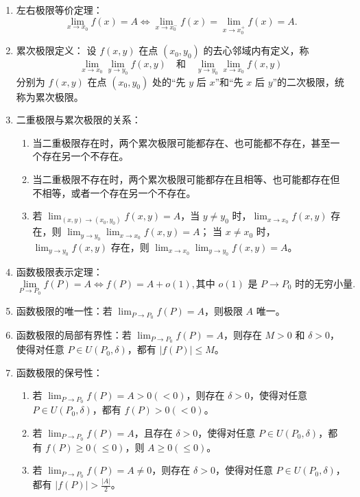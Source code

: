\documentclass[UTF8]{ctexart}
\theoremstyle{remark}
\begin{document}
\begin{enumerate}
			\item 左右极限等价定理：
			$$
			\lim_{x \to x_0} f(x) = A \iff \lim_{x \to x_0^-} f(x) = \lim_{x \to x_0^+} f(x) = A.
			$$
			
			\item 累次极限定义：
			设 $ f(x, y) $ 在点 $ (x_0, y_0) $ 的去心邻域内有定义，称
			$$
			\lim_{x \to x_0} \lim_{y \to y_0} f(x, y) \quad \text{和} \quad \lim_{y \to y_0} \lim_{x \to x_0} f(x, y)
			$$
			分别为 $ f(x, y) $ 在点 $ (x_0, y_0) $ 处的“先 $ y $ 后 $ x $”和“先 $ x $ 后 $ y $”的二次极限，统称为累次极限。
			
			\item 二重极限与累次极限的关系：
			\begin{enumerate}
				\item 当二重极限存在时，两个累次极限可能都存在、也可能都不存在，甚至一个存在另一个不存在。
				\item 当二重极限不存在时，两个累次极限可能都存在且相等、也可能都存在但不相等，或者一个存在另一个不存在。
				\item 若 $\lim_{(x, y) \to (x_0, y_0)} f(x, y) = A$，当 $ y \ne y_0 $ 时，$\lim_{x \to x_0} f(x, y)$ 存在，则 $\lim_{y \to y_0} \lim_{x \to x_0} f(x, y) = A$；
				当 $ x \ne x_0 $ 时，$\lim_{y \to y_0} f(x, y)$ 存在，则 $\lim_{x \to x_0} \lim_{y \to y_0} f(x, y) = A$。
			\end{enumerate}
			
			\item 函数极限表示定理：
			$$
			\lim_{P \to P_0} f(P) = A \iff f(P) = A + o(1), \text{其中 } o(1) \text{ 是 } P \to P_0 \text{ 时的无穷小量}.
			$$
			
			\item 函数极限的唯一性：若 $\lim_{P \to P_0} f(P) = A$，则极限 $ A $ 唯一。
			
			\item 函数极限的局部有界性：若 $\lim_{P \to P_0} f(P) = A$，则存在 $ M > 0 $ 和 $ \delta > 0 $，使得对任意 $ P \in U(P_0, \delta) $，都有 $ |f(P)| \leq M $。
			
			\item 函数极限的保号性：
			\begin{enumerate}
				\item 若 $\lim_{P \to P_0} f(P) = A > 0 (< 0)$，则存在 $ \delta > 0 $，使得对任意 $ P \in U(P_0, \delta) $，都有 $ f(P) > 0 (< 0) $。
				\item 若 $\lim_{P \to P_0} f(P) = A$，且存在 $ \delta > 0 $，使得对任意 $ P \in U(P_0, \delta) $，都有 $ f(P) \geq 0 (\leq 0) $，则 $ A \geq 0 (\leq 0) $。
				\item 若 $\lim_{P \to P_0} f(P) = A \ne 0$，则存在 $ \delta > 0 $，使得对任意 $ P \in U(P_0, \delta) $，都有 $ |f(P)| > \frac{|A|}{2} $。
			\end{enumerate}
			

\end{enumerate}
\end{document}
